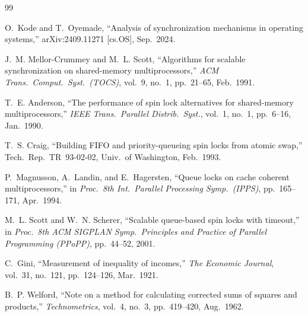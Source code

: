 \documentclass[conference]{IEEEtran}
\begin{document}


\FloatBarrier
\begin{thebibliography}{99}

O.~Kode and T.~Oyemade,
``Analysis of synchronization mechanisms in operating systems,''
arXiv:2409.11271 [cs.OS], Sep.~2024.

J.~M. Mellor-Crummey and M.~L. Scott,
``Algorithms for scalable synchronization on shared-memory
multiprocessors,''
\textit{ACM Trans.\ Comput.\ Syst.\ (TOCS)},
vol.~9, no.~1, pp.~21--65, Feb.~1991.

T.~E. Anderson,
``The performance of spin lock alternatives for shared-memory
multiprocessors,''
\textit{IEEE Trans.\ Parallel Distrib.\ Syst.},
vol.~1, no.~1, pp.~6--16, Jan.~1990.

T.~S. Craig,
``Building FIFO and priority-queueing spin locks from atomic swap,''
Tech.\ Rep.\ TR~93-02-02, Univ.\ of Washington, Feb.~1993.

P.~Magnusson, A.~Landin, and E.~Hagersten,
``Queue locks on cache coherent multiprocessors,''
in \textit{Proc.\ 8th Int.\ Parallel Processing Symp.\ (IPPS)},
pp.~165--171, Apr.~1994.

M.~L. Scott and W.~N. Scherer,
``Scalable queue-based spin locks with timeout,''
in \textit{Proc.\ 8th ACM SIGPLAN Symp.\ Principles and Practice of
Parallel Programming (PPoPP)}, pp.~44--52, 2001.

C.~Gini,
``Measurement of inequality of incomes,''
\textit{The Economic Journal},
vol.~31, no.~121, pp.~124--126, Mar.~1921.

B.~P. Welford,
``Note on a method for calculating corrected sums of squares and
products,''
\textit{Technometrics},
vol.~4, no.~3, pp.~419--420, Aug.~1962.




\end{thebibliography}
\end{document}
